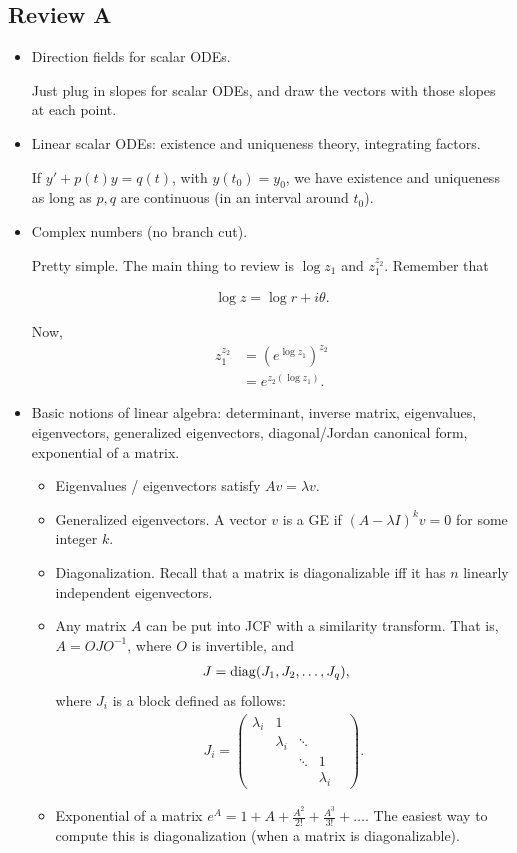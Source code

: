 \documentclass{article}
\newcommand{\mat}[1]{\begin{pmatrix}#1\end{pmatrix}}
\begin{document}
\subsection{Review A}
\begin{itemize}
  \item Direction fields for scalar ODEs.

    Just plug in slopes for scalar ODEs, and draw the vectors with those slopes at each point.

  \item Linear scalar ODEs: existence and uniqueness theory, integrating factors.

    If $y' + p(t) y = q(t)$, with $y(t_0) = y_0$, we have existence and uniqueness as long as $p, q$ are continuous (in an interval around $t_0$).

  \item Complex numbers (no branch cut).

    Pretty simple.  The main thing to review is $\log z_1$ and $z_1^{z_2}$.  Remember that

    \begin{align*}
      \log z = \log r + i \theta.
    \end{align*}

    Now,
    \begin{align*}
      z_1^{z_2} &= (e^{\log z_1})^{z_2} \\
      &= e^{z_2(\log z_1)}.
    \end{align*}


  \item Basic notions of linear algebra: determinant, inverse matrix, eigenvalues, eigenvectors, generalized eigenvectors, diagonal/Jordan canonical form, exponential of a matrix.

    \begin{itemize}
      \item Eigenvalues / eigenvectors satisfy $Av = \lambda v$.
      \item Generalized eigenvectors.  A vector $v$ is a GE if $(A - \lambda I)^k v = 0$ for some integer $k$.
      \item Diagonalization.  Recall that a matrix is diagonalizable iff it has $n$ linearly independent eigenvectors.
      \item Any matrix $A$ can be put into JCF with a similarity transform.  That is, $A = O J O^{-1}$, where $O$ is invertible, and
        \begin{align*}
          J &= \operatorname{diag}(J_1, J_2, \dots, J_q),
        \end{align*}
        where $J_i$ is a block defined as follows:
        \begin{align*}
          J_i = \mat{\lambda_i & 1 & & & \\ & \lambda_i & \ddots & & \\ & & \ddots & 1 & \\ & & & \lambda_i}.
        \end{align*}
      \item Exponential of a matrix $e^{A} = 1 + A + \frac{A^2}{2!} + \frac{A^3}{3!} + \dots$.  The easiest way to compute this is diagonalization (when a matrix is diagonalizable).


\end{itemize}
\end{itemize}
\end{document}
